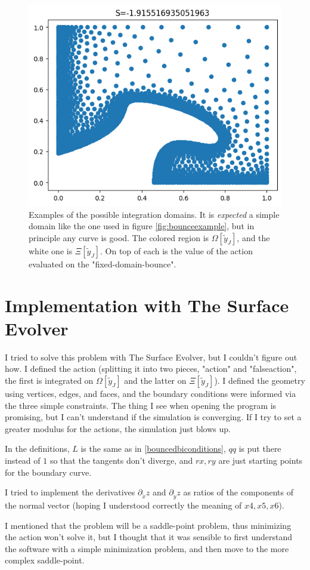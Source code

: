 \documentclass[binding=0.6cm, a4paper]{unifith}
\theoremstyle{plain}
\theoremstyle{definition}
\newcommand{\ty}{\tilde{y}}
\newcommand{\tx}{\tilde{x}}
\begin{document}
\begin{figure}[htbp]
    \qquad
    \includegraphics[width=.4\textwidth]{trasferimento (4).png}
\caption{Examples of the possible integration domains. It is \textit{expected} a simple domain like the one used in figure \ref{fig:bounceexample}, but in principle any curve is good. The colored region is $\Omega[\ty_J]$, and the white one is $\Xi[\ty_J]$. On top of each is the value of the action evaluated on the "fixed-domain-bounce".\label{fig:i}}
\end{figure}

\section*{Implementation with The Surface Evolver}

I tried to solve this problem with The Surface Evolver, but I couldn't figure out how. I defined the action (splitting it into two pieces, "action" and "falseaction", the first is integrated on $\Omega[\ty_J]$ and the latter on $\Xi[\ty_J]$). I defined the geometry using vertices, edges, and faces, and the boundary conditions were informed via the three simple constraints. The thing I see when opening the program is promising, but I can't understand if the simulation is converging. If I try to set a greater modulus for the actions, the simulation just blows up.

In the definitions, $L$ is the same as in \eqref{bouncedbiconditions}, $qq$ is put there instead of $1$ so that the tangents don't diverge, and $rx,ry$ are just starting points for the boundary curve.

I tried to implement the derivatives $\partial_\tx z$ and $\partial_\ty z$ as ratios of the components of the normal vector (hoping I understood correctly the meaning of $x4,x5,x6$).

I mentioned that the problem will be a saddle-point problem, thus minimizing the action won't solve it, but I thought that it was sensible to first understand the software with a simple minimization problem, and then move to the more complex saddle-point.
\end{document}
